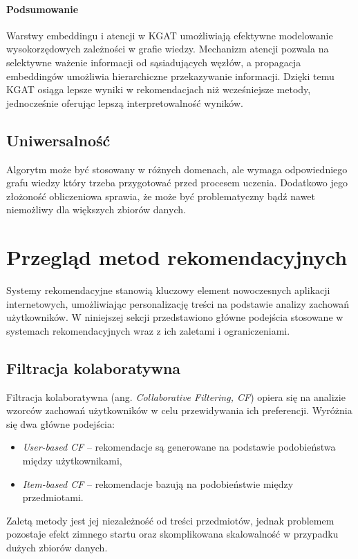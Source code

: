 \documentclass[a4paper,onecolumn]{LTJournalArticle}
\begin{document}
\paragraph{Podsumowanie} Warstwy embeddingu i atencji w KGAT umożliwiają efektywne modelowanie wysokorzędowych zależności w grafie wiedzy. Mechanizm atencji pozwala na selektywne ważenie informacji od sąsiadujących węzłów, a propagacja embeddingów umożliwia hierarchiczne przekazywanie informacji. Dzięki temu KGAT osiąga lepsze wyniki w rekomendacjach niż wcześniejsze metody, jednocześnie oferując lepszą interpretowalność wyników.

\subsection{Uniwersalność}
Algorytm może być stosowany w różnych domenach, ale wymaga odpowiedniego grafu wiedzy który trzeba przygotować przed procesem uczenia. Dodatkowo jego 
złożoność obliczeniowa sprawia, że może być problematyczny bądź nawet niemożliwy dla większych zbiorów danych.
	
\section{Przegląd metod rekomendacyjnych}

Systemy rekomendacyjne stanowią kluczowy element nowoczesnych aplikacji internetowych, umożliwiając personalizację treści na podstawie analizy zachowań użytkowników. W niniejszej sekcji przedstawiono główne podejścia stosowane w systemach rekomendacyjnych wraz z ich zaletami i ograniczeniami.

\subsection{Filtracja kolaboratywna}
Filtracja kolaboratywna (ang. \textit{Collaborative Filtering, CF}) opiera się na analizie wzorców zachowań użytkowników w celu przewidywania ich preferencji. Wyróżnia się dwa główne podejścia:
\begin{itemize}
	\item \textit{User-based CF} – rekomendacje są generowane na podstawie podobieństwa między użytkownikami,
	\item \textit{Item-based CF} – rekomendacje bazują na podobieństwie między przedmiotami.
\end{itemize}
Zaletą metody jest jej niezależność od treści przedmiotów, jednak problemem pozostaje efekt zimnego startu oraz skomplikowana skalowalność w przypadku dużych zbiorów danych.
\end{document}
